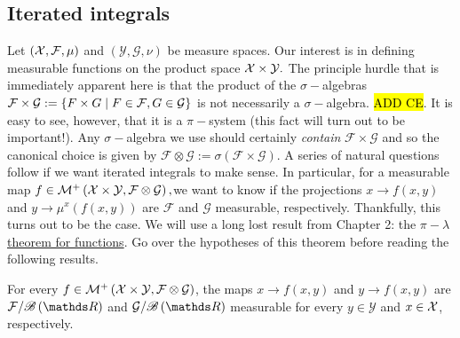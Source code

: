 \subsection{Iterated integrals}

Let $\left(\mathcal{X},\mathcal{F},\mu\right)$ and $\left(\mathcal{Y},\mathcal{G},\nu\right)$
be measure spaces. Our interest is in defining measurable functions
on the product space $\mathcal{X}\times\mathcal{Y}.$ The principle hurdle
that is immediately apparent here is that the product of the $\sigma-$algebras
$\mathcal{F}\times\mathcal{G}:=\left\{ F\times G\mid F\in\mathcal{F},G\in\mathcal{G}\right\} $
is not necessarily a $\sigma-$algebra. \hl{ADD CE}. It is easy to
see, however, that it is a $\pi-$system (this fact will turn out
to be important!). Any $\sigma-$algebra we use should certainly \emph{contain
}$\mathcal{F}\times\mathcal{G}$ and so the canonical choice is given
by $\mathcal{F}\otimes\mathcal{G:=\sigma\left(F\times G\right)}$.
A series of natural questions follow if we want iterated integrals
to make sense. In particular, for a measurable map $f\in\mathcal{M}^{+}\left(\mathcal{X}\times\mathcal{Y},\mathcal{F}\otimes\mathcal{G}\right),$we
want to know if the projections $x\to f(x,y)$ and $y\to\mu^{x}\left(f\left(x,y\right)\right)$
are $\mathcal{F}$ and $\mathcal{G}$ measurable, respectively. Thankfully,
this turns out to be the case. We will use a long lost result from
Chapter 2: the \hyperref[thm:piLambdaThmFunctions]{$\pi-\lambda$ theorem for functions}.
Go over the hypotheses of this theorem before reading the following
results.
\begin{lem}
\label{lem:partialFunctionMeasurability}For every $f\in\mathcal{M}^{+}\left(\mathcal{X}\times\mathcal{Y},\mathcal{F}\otimes\mathcal{G}\right)$,
the maps $x\to f(x,y)$ and $y\to f(x,y)$ are $\mathcal{F}/\borel\left(\R\right)$
and $\mathcal{G}/\borel\left(\R\right)$ measurable for every $y\in\mathcal{Y}$
and $x\in\mathcal{X}$, respectively.
\end{lem}

